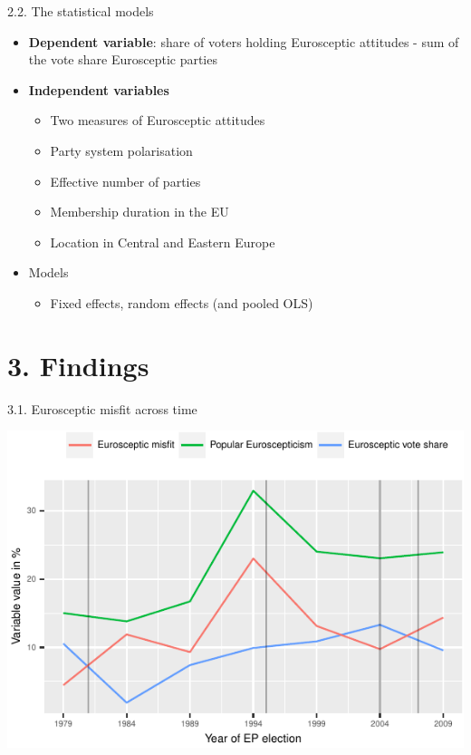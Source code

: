 \begin{frame}{2.2. The statistical models}

\begin{itemize}
\item
  \textbf{Dependent variable}: share of voters holding Eurosceptic
  attitudes - sum of the vote share Eurosceptic parties
\item
  \textbf{Independent variables}

  \begin{itemize}
  \tightlist
  \item
    Two measures of Eurosceptic attitudes
  \item
    Party system polarisation
  \item
    Effective number of parties
  \item
    Membership duration in the EU
  \item
    Location in Central and Eastern Europe
  \end{itemize}
\item
  Models

  \begin{itemize}
  \tightlist
  \item
    Fixed effects, random effects (and pooled OLS)
  \end{itemize}
\end{itemize}

\end{frame}

\section{3. Findings}\label{findings}

\begin{frame}{3.1. Eurosceptic misfit across time}

\begin{center}\includegraphics{graphs/graph-1} \end{center}

\end{frame}

